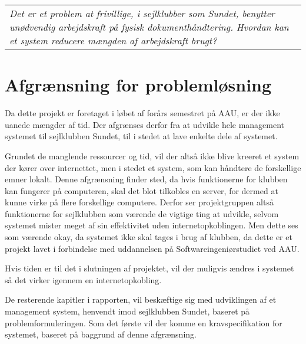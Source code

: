 \begin{center}
  \begin{tabular}{|p{14cm}|}
    \textit{Det er et problem at frivillige, i sejlklubber som Sundet, benytter unødvendig arbejdskraft på
    fysisk dokumenthåndtering. Hvordan kan et system reducere mængden af arbejdskraft brugt? }
  \end{tabular}
\end{center}


\section{Afgrænsning for problemløsning}

Da dette projekt er foretaget i løbet af forårs semestret på AAU, er der ikke uanede mængder af tid. Der
afgrænses derfor fra at udvikle hele management systemet til sejlklubben Sundet, til i stedet at lave enkelte
dele af systemet.

Grundet de manglende ressourcer og tid, vil der altså ikke blive kreeret et system der kører over internettet,
men i stedet et system, som kan håndtere de forskellige emner lokalt. Denne afgrænsning finder sted, da hvis
funktionerne for klubben kan fungerer på computeren, skal det blot tilkobles en server, for dermed at kunne
virke på flere forskellige computere. Derfor ser projektgruppen altså funktionerne for sejlklubben som værende
de vigtige ting at udvikle, selvom systemet mister meget af sin effektivitet uden internetopkoblingen. Men
dette ses som værende okay, da systemet ikke skal tages i brug af klubben, da dette er et projekt lavet i
forbindelse med uddannelsen på Softwareingeniørstudiet ved AAU.

Hvis tiden er til det i slutningen af projektet, vil der muligvis ændres i systemet så det virker igennem en
internetopkobling.

De resterende kapitler i rapporten, vil beskæftige sig med udviklingen af et management system, henvendt imod
sejlklubben Sundet, baseret på problemformuleringen. Som det første vil der komme en kravspecifikation for
systemet, baseret på baggrund af denne afgrænsning.
